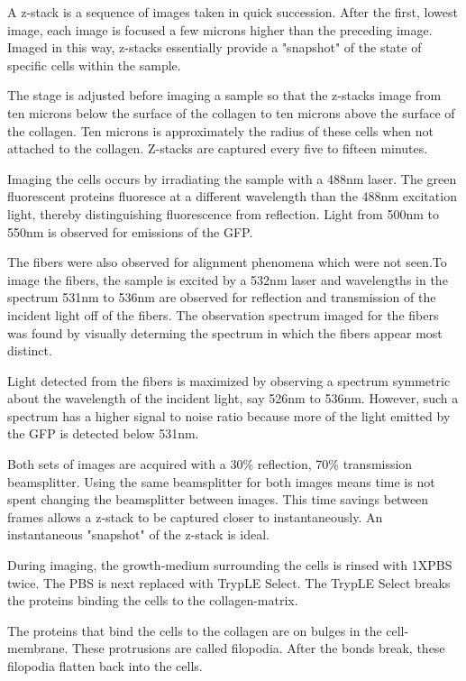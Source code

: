 \documentclass[ twocolumn,notitlepage]{ revtex4-1}
\begin{document}
A z-stack is a sequence of images taken in quick succession. After the first, lowest image, each image is focused a few microns higher than the preceding image. Imaged in this way, z-stacks essentially provide a "snapshot" of the state of specific cells within the sample.

The stage is adjusted before imaging a sample so that the z-stacks image from ten microns below the surface of the collagen to ten microns above the surface of the collagen. Ten microns is approximately the radius of these cells when not attached to the collagen. Z-stacks are captured every five to fifteen minutes.

Imaging the cells occurs by irradiating the sample with a 488nm laser. The green fluorescent proteins fluoresce at a different wavelength than the 488nm excitation light, thereby distinguishing fluorescence from reflection. Light from 500nm to 550nm is observed for emissions of the GFP. 

The fibers were also observed for alignment phenomena which were not seen.To image the fibers, the sample is excited by a 532nm laser and wavelengths in the spectrum 531nm to 536nm are observed for reflection and transmission of the incident light off of the fibers. The observation spectrum imaged for the fibers was found by visually determing the spectrum in which the fibers appear most distinct.

Light detected from the fibers is maximized by observing a spectrum symmetric about the wavelength of the incident light, say 526nm to 536nm. However, such a spectrum has a higher signal to noise ratio because more of the light emitted by the GFP is detected below 531nm.

Both sets of images are acquired with a 30\% reflection, 70\% transmission beamsplitter. Using the same beamsplitter for both images means time is not spent changing the beamsplitter between images. This time savings between frames allows a z-stack to be captured closer to instantaneously. An instantaneous "snapshot" of the z-stack is ideal. 

During imaging, the growth-medium surrounding the cells is rinsed with 1XPBS twice. The PBS is next replaced with TrypLE Select. The TrypLE Select breaks the proteins binding the cells to the collagen-matrix.

The proteins that bind the cells to the collagen are on bulges in the cell-membrane. These protrusions are called filopodia. After the bonds break, these filopodia flatten back into the cells.
\end{document}
